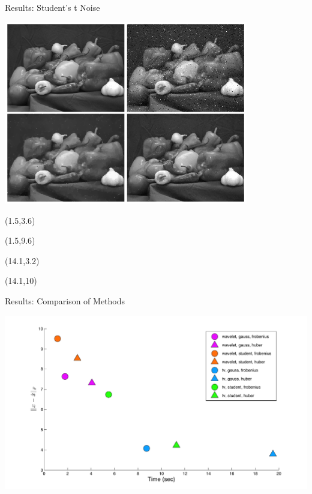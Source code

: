 \documentclass[12pt]{beamer}
\begin{document}
\begin{frame}{Results: Student's t Noise}
\begin{center}
\vspace{-3 mm}
\includegraphics[width = 0.8\textwidth]{../figures/student-t_peppers.png} 
\end{center}

\begin{textblock}{5}(1.5,3.6)
\end{textblock}

\begin{textblock}{5}(1.5,9.6)
\end{textblock}

\begin{textblock}{5}(14.1,3.2)
\end{textblock}

\begin{textblock}{5}(14.1,10)
\end{textblock}

\end{frame}

\begin{frame}{Results: Comparison of Methods}
	\begin{center}
		\vspace{-3 mm}
		\includegraphics[scale=0.40]{../figures/comparePlot2.pdf}
	\end{center}
\end{frame}
\end{document}
